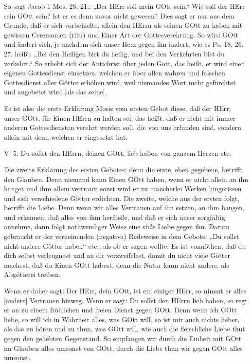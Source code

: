 So sagt Jacob 1 Mos. 28, 21.: „Der HErr soll mein GOtt sein.“ Wie soll der HErr sein GOtt sein? Ist er es denn zuvor nicht gewesen? Dies sagt er nur aus dem Grunde, daß er sich vorbehielte, allein den HErrn als seinen GOtt zu haben mit gewissen Ceremonien (ritu) und Einer Art der Gottesverehrung. So wird GOtt und ändert sich, je nachdem sich unser Herz gegen ihn ändert, wie es Ps. 18, 26. 27. heißt: „Bei den Heiligen bist du heilig, und bei den Verkehrten bist du verkehrt.“ So erhebt sich der Antichrist über jeden Gott, das heißt, er wird einen eigenen Gottesdienst einsetzen, welchen er über allen wahren und falschen Gottesdienst aller Götter erhöhen wird, weil niemandes Wort mehr gefürchtet und angebetet wird [als das seine].

Es ist also die erste Erklärung Mosis vom ersten Gebot diese, daß der HErr, unser GOtt, für Einen HErrn zu halten sei, das heißt, daß er nicht mit immer anderen Gottesdiensten verehrt werden soll, die von uns erfunden sind, sondern allein mit dem, welchen er eingesetzt hat.

\begin{schriftzitat}
V. 5. Du sollst den HErrn, deinen GOtt, lieb haben von ganzem Herzen etc.
\end{schriftzitat}

Die zweite Erklärung des ersten Gebotes; denn die erste, eben gegebene, betrifft den Glauben. Denn niemand kann Einen GOtt haben, wenn er nicht allein an ihn hanget und ihm allein vertraut; sonst wird er zu mancherlei Werken hingerissen und sich verschiedene Götter erdichten. Die zweite, welche aus der ersten folgt, betrifft die Liebe. Denn wenn wir alles Vertrauen auf ihn setzen, an ihm hangen, und erkennen, daß alles von ihm herfließe, und daß er sich unser sorgfältig annehme, dann folgt nothwendiger Weise eine süße Liebe gegen ihn. Darum gebraucht er der verneinenden (negativa) Redeweise in dem Gebote: „Du sollst nicht andere Götter haben“ etc., als ob er sagen wollte: Es ist vonnöthen, daß du dich selbst verleugnest und an dir verzweifelest, damit du nicht viele Götter machest, daß du Einen GOtt habest, denn die Natur kann nicht anders, als Abgötterei treiben.

Wenn er daher sagt: Der HErr, dein GOtt, ist ein einiger HErr, so nimmt er alles [andere] Vertrauen hinweg. Wenn er sagt: Du sollst den HErrn lieb haben, so regt er an zu einem fröhlichen und freien Dienst gegen GOtt. Denn wenn ich GOtt liebe, so will ich in Wahrheit alles, was GOtt will, so ist mir auch nichts lieber, als das zu hören und zu thun, was GOtt will, wie auch die fleischliche Liebe thut gegen den geliebten Gegenstand. So empfangen wir durch die Einheit mit GOtt im Glauben alles umsonst von GOtt, durch die Liebe thun wir gegen GOtt alles umsonst.

